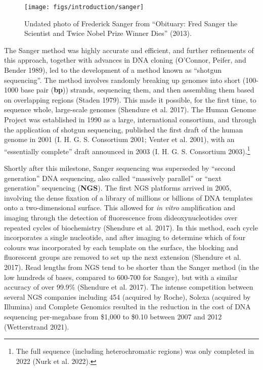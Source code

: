 \documentclass[
]{book}
\begin{document}
\begin{figure}

{\centering \texttt{[image: figs/introduction/sanger]} 

}

\caption{Undated photo of Frederick Sanger from {``Obituary: {Fred Sanger} the Scientist and Twice {Nobel Prize} Winner Dies''} (2013).}\label{fig:sanger}
\end{figure}

The Sanger method was highly accurate and efficient, and further refinements of this approach, together with advances in DNA cloning (O'Connor, Peifer, and Bender 1989), led to the development of a method known as ``shotgun sequencing''. The method involves randomly breaking up genomes into short (100-1000 base pair (\textbf{bp})) strands, sequencing them, and then assembling them based on overlapping regions (Staden 1979). This made it possible, for the first time, to sequence whole, large-scale genomes (Shendure et al. 2017). The Human Genome Project was established in 1990 as a large, international consortium, and through the application of shotgun sequencing, published the first draft of the human genome in 2001 (I. H. G. S. Consortium 2001; Venter et al. 2001), with an ``essentially complete'' draft announced in 2003 (I. H. G. S. Consortium 2003).\footnote{The full sequence (including heterochromatic regions) was only completed in 2022 (Nurk et al. 2022).}

Shortly after this milestone, Sanger sequencing was superseded by ``second generation'' DNA sequencing, also called ``massively parallel'' or ``next generation'' sequencing (\textbf{NGS}). The first NGS platforms arrived in 2005, involving the dense fixation of a library of millions or billions of DNA templates onto a two-dimensional surface. This allowed for \emph{in vitro} amplification and imaging through the detection of fluorescence from dideoxynucleotides over repeated cycles of biochemistry (Shendure et al. 2017). In this method, each cycle incorporates a single nucleotide, and after imaging to determine which of four colours was incorporated by each template on the surface, the blocking and fluorescent groups are removed to set up the next extension (Shendure et al. 2017). Read lengths from NGS tend to be shorter than the Sanger method (in the low hundreds of bases, compared to 600-700 for Sanger), but with a similar accuracy of over 99.9\% (Shendure et al. 2017). The intense competition between several NGS companies including 454 (acquired by Roche), Solexa (acquired by Illumina) and Complete Genomics resulted in the reduction in the cost of DNA sequencing per-megabase from \$1,000 to \$0.10 between 2007 and 2012 (Wetterstrand 2021).
\end{document}
